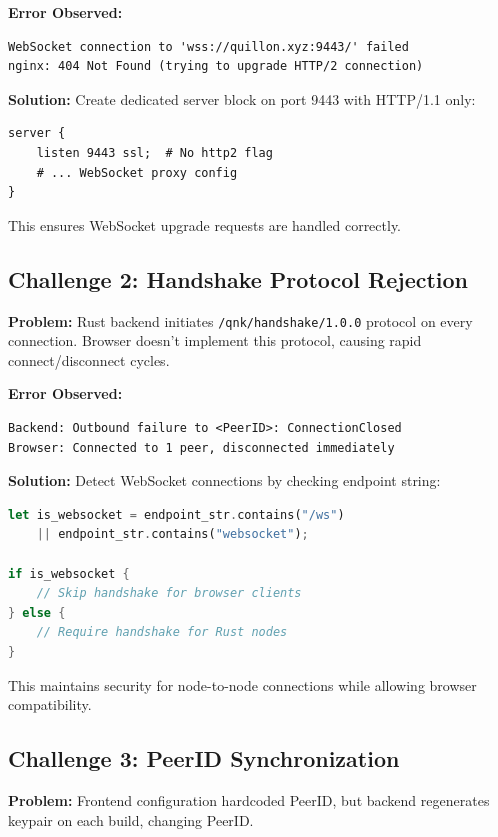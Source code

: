 \documentclass[11pt,a4paper]{article}
\begin{document}
\textbf{Error Observed:}
\begin{verbatim}
WebSocket connection to 'wss://quillon.xyz:9443/' failed
nginx: 404 Not Found (trying to upgrade HTTP/2 connection)
\end{verbatim}

\textbf{Solution:} Create dedicated server block on port 9443 with HTTP/1.1 only:

\begin{lstlisting}
server {
    listen 9443 ssl;  # No http2 flag
    # ... WebSocket proxy config
}
\end{lstlisting}

This ensures WebSocket upgrade requests are handled correctly.

\subsection{Challenge 2: Handshake Protocol Rejection}

\textbf{Problem:} Rust backend initiates \texttt{/qnk/handshake/1.0.0} protocol on every connection. Browser doesn't implement this protocol, causing rapid connect/disconnect cycles.

\textbf{Error Observed:}
\begin{verbatim}
Backend: Outbound failure to <PeerID>: ConnectionClosed
Browser: Connected to 1 peer, disconnected immediately
\end{verbatim}

\textbf{Solution:} Detect WebSocket connections by checking endpoint string:

\begin{lstlisting}[language=Rust]
let is_websocket = endpoint_str.contains("/ws")
    || endpoint_str.contains("websocket");

if is_websocket {
    // Skip handshake for browser clients
} else {
    // Require handshake for Rust nodes
}
\end{lstlisting}

This maintains security for node-to-node connections while allowing browser compatibility.

\subsection{Challenge 3: PeerID Synchronization}

\textbf{Problem:} Frontend configuration hardcoded PeerID, but backend regenerates keypair on each build, changing PeerID.
\end{document}
